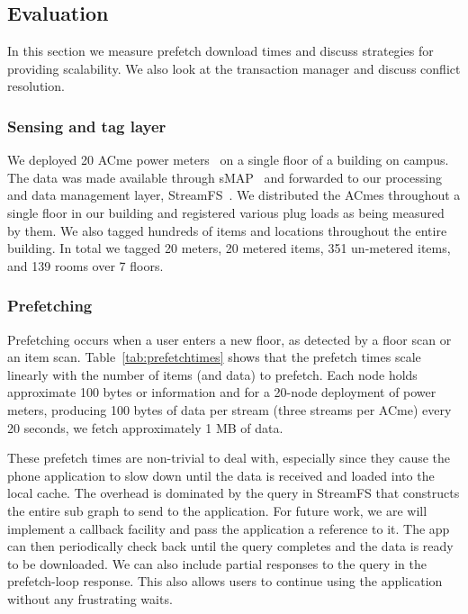\subsection{Evaluation}
\label{sec:eval}


In this section we measure prefetch download times and discuss strategies for providing scalability.  We also
look at the transaction manager and discuss conflict resolution.

\subsubsection{Sensing and tag layer}
We deployed 20 ACme power meters~\cite{acme} on a single floor of a building on campus.  The data was made available through
sMAP~\cite{smap} and forwarded to our processing and data management layer, StreamFS~\cite{streamfs}.  We distributed
the ACmes throughout a single floor in our building and registered various plug loads as being measured by them.  We also tagged
hundreds of items and locations throughout the entire building.  In total we tagged 20 meters, 20 metered items, 351 un-metered items,
 and 139 rooms over 7 floors.

\subsubsection{Prefetching}
Prefetching occurs when a user enters a new floor, as detected by a floor scan or an item
scan.  Table~\ref{tab:prefetchtimes} shows that the prefetch times scale linearly with the number of
items (and data) to prefetch.  Each node holds approximate 100 bytes or information and for
a 20-node deployment of power meters, producing 100 bytes of data per stream (three streams per ACme) every 20 seconds, we fetch 
approximately 1 MB of data.

These prefetch times are non-trivial to deal with, especially since they cause the phone application to slow down
until the data is received and loaded into the local cache.  The overhead is dominated by the query in StreamFS that 
constructs the entire sub graph to send to the application.  For future work,  we are will implement a
callback facility and pass the application a reference to it.  The app can then periodically check back until
the query completes and the data is ready to be downloaded.  We can also include partial responses to the query
in the prefetch-loop response.  This also allows users to continue using the application without any frustrating waits.

